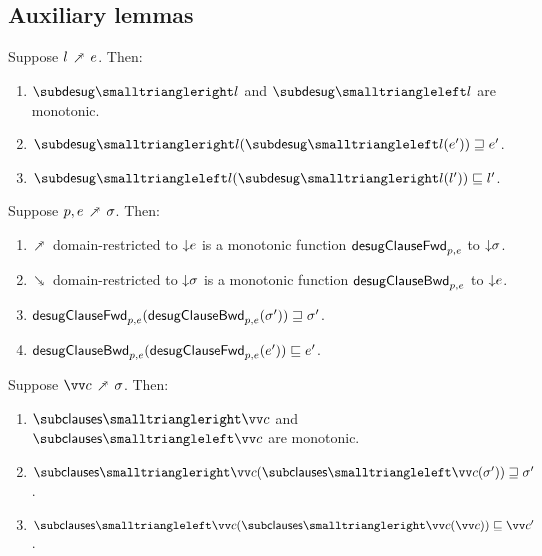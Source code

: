 \subsection{Auxiliary lemmas}

\begin{lemma}
  \label{lem:aux:desugarlistrest:gc}
  Suppose $l \dfwdarrow e$. Then:
  \begin{enumerate}
     \item $\desugarListRestFwdF{l}$ and $\desugarListRestBwdF{l}$ are monotonic.
     \item $\desugarListRestFwdF{l}(\desugarListRestBwdF{l}(e')) \geq e'$.
     \item $\desugarListRestBwdF{l}(\desugarListRestFwdF{l}(l')) \leq l'$.
  \end{enumerate}
\end{lemma}
\begin{lemma}
  \label{lem:aux:clause:gc}
  Suppose $p, e \dfwdarrow \sigma$. Then:
  \begin{enumerate}
     \item $\dfwdarrow$ domain-restricted to ${\downarrow}{e}$ is a monotonic function $\mathsf{desugClauseFwd}_{p, e}$ to ${\downarrow}{\sigma}$.
     \item $\dbwdarrow$ domain-restricted to ${\downarrow}{\sigma}$ is a monotonic function $\mathsf{desugClauseBwd}_{p, e}$ to ${\downarrow}{e}$.
     \item $\mathsf{desugClauseFwd}_{p, e}(\mathsf{desugClauseBwd}_{p, e}(\sigma')) \sqsupseteq \sigma'$.
     \item $\mathsf{desugClauseBwd}_{p, e}(\mathsf{desugClauseFwd}_{p, e}(e')) \sqsubseteq e'$.
  \end{enumerate}
\end{lemma}
\begin{lemma}
  \label{lem:aux:clauses:gc}
  Suppose $\vec{c} \dfwdarrow \sigma$. Then:
  \begin{enumerate}
     \item $\desugarClausesFwdF{\vec{c}}$ and $\desugarClausesBwdF{\vec{c}}$ are monotonic.
     \item $\desugarClausesFwdF{\vec{c}}(\desugarClausesBwdF{\vec{c}}(\sigma')) \geq \sigma'$.
     \item $\desugarClausesBwdF{\vec{c}}(\desugarClausesFwdF{\vec{c}}(\vec{c})) \leq \vec{c}'$.
  \end{enumerate}
\end{lemma}

